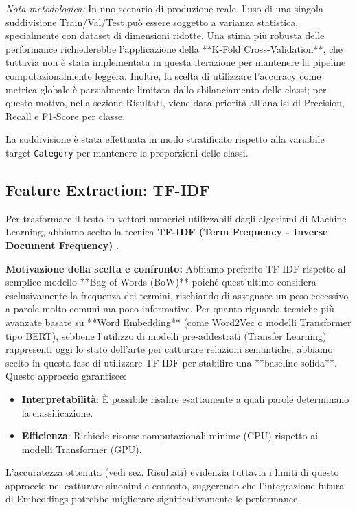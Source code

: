 \documentclass[a4paper,12pt]{article}
\begin{document}
\textit{Nota metodologica:} In uno scenario di produzione reale, l'uso di una singola suddivisione Train/Val/Test può essere soggetto a varianza statistica, specialmente con dataset di dimensioni ridotte. Una stima più robusta delle performance richiederebbe l'applicazione della **K-Fold Cross-Validation**, che tuttavia non è stata implementata in questa iterazione per mantenere la pipeline computazionalmente leggera. Inoltre, la scelta di utilizzare l'accuracy come metrica globale è parzialmente limitata dallo sbilanciamento delle classi; per questo motivo, nella sezione Risultati, viene data priorità all'analisi di Precision, Recall e F1-Score per classe.

La suddivisione è stata effettuata in modo stratificato rispetto alla variabile target \texttt{Category} per mantenere le proporzioni delle classi.

\subsection{Feature Extraction: TF-IDF}
Per trasformare il testo in vettori numerici utilizzabili dagli algoritmi di Machine Learning, abbiamo scelto la tecnica \textbf{TF-IDF (Term Frequency - Inverse Document Frequency)} \cite{tfidf}.

\textbf{Motivazione della scelta e confronto:}
Abbiamo preferito TF-IDF rispetto al semplice modello **Bag of Words (BoW)** poiché quest'ultimo considera esclusivamente la frequenza dei termini, rischiando di assegnare un peso eccessivo a parole molto comuni ma poco informative.
Per quanto riguarda tecniche più avanzate basate su **Word Embedding** (come Word2Vec o modelli Transformer tipo BERT), sebbene l'utilizzo di modelli pre-addestrati (Transfer Learning) rappresenti oggi lo stato dell'arte per catturare relazioni semantiche, abbiamo scelto in questa fase di utilizzare TF-IDF per stabilire una **baseline solida**. Questo approccio garantisce:
\begin{itemize}
    \item \textbf{Interpretabilità}: È possibile risalire esattamente a quali parole determinano la classificazione.
    \item \textbf{Efficienza}: Richiede risorse computazionali minime (CPU) rispetto ai modelli Transformer (GPU).
\end{itemize}
L'accuratezza ottenuta (vedi sez. Risultati) evidenzia tuttavia i limiti di questo approccio nel catturare sinonimi e contesto, suggerendo che l'integrazione futura di Embeddings potrebbe migliorare significativamente le performance.
\end{document}
